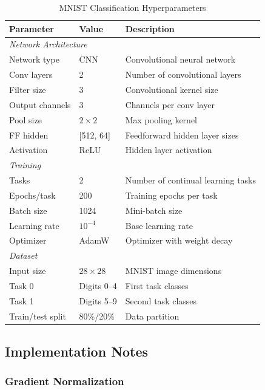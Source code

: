 {\small
\begin{table}[h]
\centering
\caption{MNIST Classification Hyperparameters}
\label{tab:mnist_hyperparams}
\begin{tabular}{lll}
\hline
\textbf{Parameter} & \textbf{Value} & \textbf{Description} \\
\hline
\multicolumn{3}{l}{\textit{Network Architecture}} \\
Network type & CNN & Convolutional neural network \\
Conv layers & 2 & Number of convolutional layers \\
Filter size & 3 & Convolutional kernel size \\
Output channels & 3 & Channels per conv layer \\
Pool size & $2 \times 2$ & Max pooling kernel \\
FF hidden & [512, 64] & Feedforward hidden layer sizes \\
Activation & ReLU & Hidden layer activation \\
\hline
\multicolumn{3}{l}{\textit{Training}} \\
Tasks & 2 & Number of continual learning tasks \\
Epochs/task & 200 & Training epochs per task \\
Batch size & 1024 & Mini-batch size \\
Learning rate & $10^{-4}$ & Base learning rate \\
Optimizer & AdamW & Optimizer with weight decay \\
\hline
\multicolumn{3}{l}{\textit{Dataset}} \\
Input size & $28 \times 28$ & MNIST image dimensions \\
Task 0 & Digits 0--4 & First task classes \\
Task 1 & Digits 5--9 & Second task classes \\
Train/test split & 80\%/20\% & Data partition \\
\hline
\end{tabular}
\end{table}
}

\subsection{Implementation Notes}

\subsubsection{Gradient Normalization}

